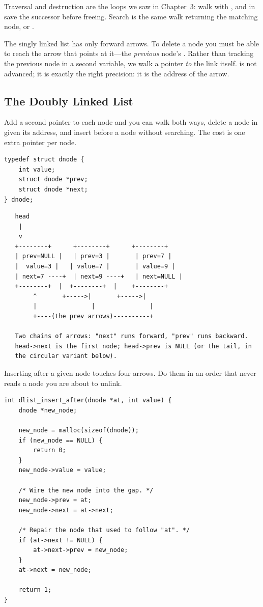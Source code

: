 Traversal and destruction are the loops we saw in Chapter~3: walk with
, and in  save the successor
before freeing. Search is the same walk returning the matching node, or
.

\begin{insight}
The singly linked list has only forward arrows. To delete a node you
must be able to reach the arrow that points at it---the \emph{previous}
node's . Rather than tracking the previous node in a second
variable, we walk a pointer \emph{to} the link itself. 
is not advanced; it is exactly the right precision: it is the address
of the arrow.
\end{insight}

\subsection{The Doubly Linked List}

Add a second pointer to each node and you can walk both ways, delete a
node in  given its address, and insert before a node without
searching. The cost is one extra pointer per node.

\begin{lstlisting}[caption={The doubly linked node.}]
typedef struct dnode {
    int value;
    struct dnode *prev;
    struct dnode *next;
} dnode;
\end{lstlisting}

\begin{verbatim}
   head
    |
    v
   +--------+      +--------+      +--------+
   | prev=NULL |   | prev=3 |       | prev=7 |
   |  value=3 |   | value=7 |       | value=9 |
   | next=7 ----+  | next=9 ----+   | next=NULL |
   +--------+  |  +--------+  |    +--------+
        ^       +----->|       +----->|
        |               |               |
        +----(the prev arrows)----------+

   Two chains of arrows: "next" runs forward, "prev" runs backward.
   head->next is the first node; head->prev is NULL (or the tail, in
   the circular variant below).
\end{verbatim}

Inserting after a given node touches four arrows. Do them in an order
that never reads a node you are about to unlink.

\begin{lstlisting}[caption={Insert a new node right after node at.}]
int dlist_insert_after(dnode *at, int value) {
    dnode *new_node;

    new_node = malloc(sizeof(dnode));
    if (new_node == NULL) {
        return 0;
    }
    new_node->value = value;

    /* Wire the new node into the gap. */
    new_node->prev = at;
    new_node->next = at->next;

    /* Repair the node that used to follow "at". */
    if (at->next != NULL) {
        at->next->prev = new_node;
    }
    at->next = new_node;

    return 1;
}
\end{lstlisting}

